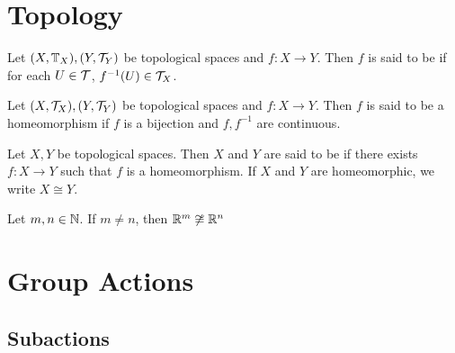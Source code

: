 \documentclass{book}
\begin{document}
\newpage
\section{Topology}

\begin{defn}
Let $(X, \mathbb{T}_X), (Y, \mathcal{T}_Y)$ be topological spaces and $f:X\rightarrow Y$. Then $f$ is said to be  if for each $U \in \mathcal{T}$, $f^{-1}(U) \in \mathcal{T}_X$.
\end{defn}

\begin{defn}
Let $(X, \mathcal{T}_X), (Y, \mathcal{T}_Y)$ be topological spaces and $f:X\rightarrow Y$. Then $f$ is said to be a homeomorphism if $f$ is a bijection and $f, f^{-1}$ are continuous. 
\end{defn}

\begin{defn}
Let $X, Y$ be topological spaces. Then $X$ and $Y$ are said to be  if there exists $f:X \rightarrow Y$ such that $f$ is a homeomorphism. If $X$ and $Y$ are homeomorphic, we write $X \cong Y$. 
\end{defn}

\begin{thm}
Let $m,n \in \mathbb{N}$. If $m \neq n$, then $\mathbb{R}^m \not \cong \mathbb{R}^n$
\end{thm}







































\section{Group Actions}

\subsection{Subactions}
\end{document}

